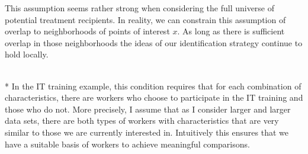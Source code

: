 This assumption seems rather strong when considering the full universe of potential treatment recipients.
In reality, we can constrain this assumption of overlap to neighborhoods of points of interest $x$.
As long as there is sufficient overlap in those neighborhoods the ideas of our identification strategy continue to hold locally.
\begin{boxE}
    \addtocounter{exmp}{-1}
    \begin{exmp}\mbox{}\\*
        In the IT training example, this condition requires that for each combination of characteristics, there are workers who choose to participate in the IT training and those who do not.
        More precisely, I assume that as I consider larger and larger data sets, there are both types of workers with characteristics that are very similar to those we are currently interested in.
        Intuitively this ensures that we have a suitable basis of workers to achieve meaningful comparisons.
    \end{exmp}    
\end{boxE}

